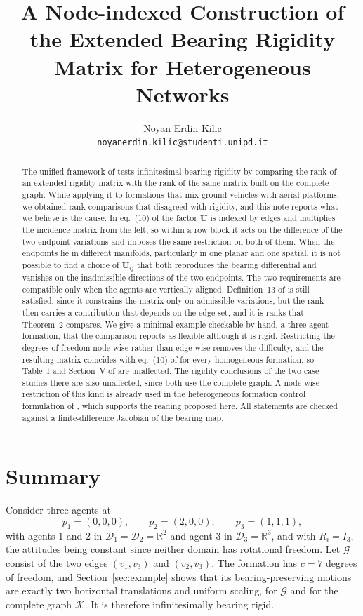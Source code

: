 \documentclass[11pt,a4paper]{article}
\title{\bf A Node-indexed Construction of the Extended Bearing Rigidity Matrix for Heterogeneous Networks}
\author{Noyan Erdin Kilic\\
\texttt{noyanerdin.kilic@studenti.unipd.it}}
\date{}
\theoremstyle{plain}
\theoremstyle{definition}
\newcommand{\R}{\mathbb{R}}
\begin{document}
\maketitle

\begin{abstract}
The unified framework of \cite{michieletto2021} tests infinitesimal bearing
rigidity by comparing the rank of an extended rigidity matrix with the rank of
the same matrix built on the complete graph. While applying it to formations
that mix ground vehicles with aerial platforms, we obtained rank comparisons
that disagreed with rigidity, and this note reports what we believe is the
cause. In eq.~(10) of \cite{michieletto2021} the factor $\mathbf U$ is indexed by edges
and multiplies the incidence matrix from the left, so within a row block it acts on the
difference of the two endpoint variations and imposes the same restriction on
both of them. When the endpoints lie in different manifolds, particularly in one planar and
one spatial, it is not possible to find a choice of $\mathbf U_{ij}$ that both
reproduces the bearing differential and vanishes on the inadmissible
directions of the two endpoints. The two requirements are compatible only when
the agents are vertically aligned. Definition~13 of \cite{michieletto2021} is
still satisfied, since it constrains the matrix only on admissible variations,
but the rank then carries a contribution that depends on the edge set, and it
is ranks that Theorem~2 compares. We give a minimal example checkable by hand, a three-agent formation, that the comparison reports as flexible although it is rigid. Restricting
the degrees of freedom node-wise rather than edge-wise removes the difficulty,
and the resulting matrix coincides with eq.~(10) of \cite{michieletto2021} for
every homogeneous formation, so Table~I and Section~V of
\cite{michieletto2021} are unaffected. The rigidity conclusions of the two
case studies there are also unaffected, since both use the complete graph. A node-wise restriction of this kind is already used in the
heterogeneous formation control formulation of \cite{Pozzan2021}, which
supports the reading proposed here. All statements are checked against a
finite-difference Jacobian of the bearing map.
\end{abstract}

\section{Summary}

Consider three agents at
\begin{equation}\label{eq:ex}
  p_1=(0,0,0),\qquad p_2=(2,0,0),\qquad p_3=(1,1,1),
\end{equation}
with agents $1$ and $2$ in $\mathcal D_1=\mathcal D_2=\R^2$ and
agent $3$ in $\mathcal D_3=\R^3$, and with $R_i = I_3$, the attitudes being constant since neither domain has rotational freedom. Let $\mathcal G$ consist of the two edges
$(v_1,v_3)$ and $(v_2,v_3)$. The formation has $c=7$ degrees of freedom, and
Section~\ref{sec:example} shows that its bearing-preserving motions are exactly
two horizontal translations and uniform scaling, for $\mathcal G$ and for the
complete graph $\mathcal K$. It is therefore infinitesimally bearing rigid.
\end{document}
